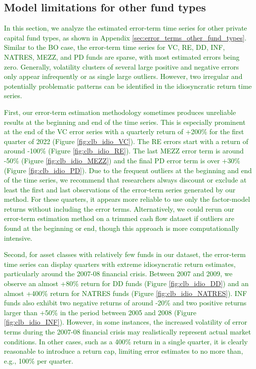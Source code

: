 \documentclass[12pt]{article}
\begin{document}
\subsection{Model limitations for other fund types}

\textcolor{darkgreen}{
	In this section, we analyze the estimated error-term time series for other private capital fund types, as shown in Appendix \ref{sec:error_terms_other_fund_types}.
	Similar to the BO case, the error-term time series for VC, RE, DD, INF, NATRES, MEZZ, and PD funds are sparse, with most estimated errors being zero. 
	Generally, volatility clusters of several large positive and negative errors only appear infrequently or as single large outliers. 
	However, two irregular and potentially problematic patterns can be identified in the idiosyncratic return time series.
}

\textcolor{darkgreen}{
	First, our error-term estimation methodology sometimes produces unreliable results at the beginning and end of the time series.
	This is especially prominent at the end of the VC error series with a quarterly return of +200\% for the first quarter of 2022 (Figure \ref{fig:clb_idio_VC}). 
	The RE errors start with a return of around -100\% (Figure \ref{fig:clb_idio_RE}).
	The last MEZZ error term is around -50\% (Figure \ref{fig:clb_idio_MEZZ}) and the final PD error term is over +30\% (Figure \ref{fig:clb_idio_PD}).
	Due to the frequent outliers at the beginning and end of the time series, we recommend that researchers always discount or exclude at least the first and last observations of the error-term series generated by our method. 
	For these quarters, it appears more reliable to use only the factor-model returns without including the error terms.
	Alternatively, we could rerun our error-term estimation method on a trimmed cash flow dataset if outliers are found at the beginning or end, though this approach is more computationally intensive.
}

\textcolor{darkgreen}{
	Second, for asset classes with relatively few funds in our dataset, the error-term time series can display quarters with extreme idiosyncratic return estimates, particularly around the 2007-08 financial crisis.
	Between 2007 and 2009, we observe an almost +80\% return for DD funds (Figure \ref{fig:clb_idio_DD}) and an almost +400\% return for NATRES funds (Figure \ref{fig:clb_idio_NATRES}).
	INF funds also exhibit two negative returns of around -20\% and two positive returns larger than +50\% in the period between 2005 and 2008 (Figure \ref{fig:clb_idio_INF}).
	However, in some instances, the increased volatility of error terms during the 2007-08 financial crisis may realistically represent actual market conditions. 
	In other cases, such as a 400\% return in a single quarter, it is clearly reasonable to introduce a return cap, limiting error estimates to no more than, e.g., 100\% per quarter.
}
\end{document}

